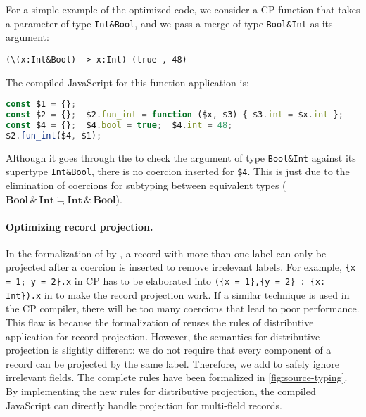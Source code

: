 For a simple example of the optimized code, we consider a CP function that takes
a parameter of type \lstinline{Int&Bool}, and we pass a merge of type
\lstinline{Bool&Int} as its argument:
\begin{lstlisting}
(\(x:Int&Bool) -> x:Int) (true , 48)
\end{lstlisting}
The compiled JavaScript for this function application is:
\begin{lstlisting}[language=TypeScript]
const $1 = {};
const $2 = {};  $2.fun_int = function ($x, $3) { $3.int = $x.int };
const $4 = {};  $4.bool = true;  $4.int = 48;
$2.fun_int($4, $1);
\end{lstlisting}
Although it goes through the  to check the argument of type
\lstinline{Bool&Int} against its supertype \lstinline{Int&Bool}, there is no
coercion inserted for \lstinline{$4}. This is just due to the elimination of
coercions for subtyping between equivalent types ($ \mathbf{Bool}   \, {\&} \,   \mathbf{Int}   \fallingdotseq   \mathbf{Int}   \, {\&} \,   \mathbf{Bool} $).


\paragraph{Optimizing record projection.} \label{sec:proj}
In the formalization of \fiplus by \citet{fan2022direct}, a record with more
than one label can only be projected after a coercion is inserted to remove
irrelevant labels. For example, \lstinline|{x = 1; y = 2}.x| in CP has to be
elaborated into \lstinline|({x = 1},{y = 2} : {x: Int}).x| in \fiplus to make
the record projection work. If a similar technique is used in the CP compiler,
there will be too many coercions that lead to poor performance. This flaw is
because the formalization of \fiplus reuses the rules of distributive
application for record projection. However, the semantics for distributive
projection is slightly different: we do not require that every component of a
record can be projected by the same label. Therefore, we add  to
safely ignore irrelevant fields. The complete rules have been formalized in
\autoref{fig:source-typing}. By implementing the new rules for distributive
projection, the compiled JavaScript can directly handle projection for
multi-field records.

